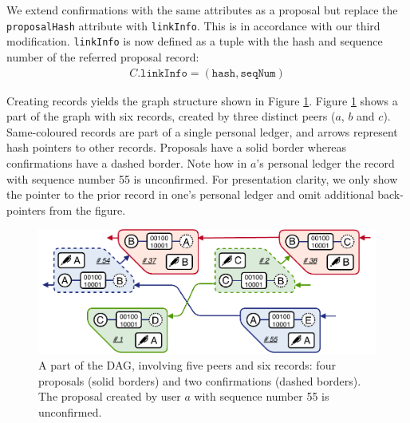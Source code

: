 We extend confirmations with the same attributes as a proposal but replace the \texttt{proposalHash} attribute with \texttt{linkInfo}.
This is in accordance with our third modification.
\texttt{linkInfo} is now defined as a tuple with the hash and sequence number of the referred proposal record:
\begin{align*}
	C.\texttt{linkInfo} = (\texttt{hash}, \texttt{seqNum})
\end{align*}

Creating records yields the graph structure shown in Figure \ref{fig:fullchain}.
Figure \ref{fig:fullchain} shows a part of the \TrustChain{} graph with six records, created by three distinct peers ($ a $, $ b $ and $ c $).
Same-coloured records are part of a single personal ledger, and arrows represent hash pointers to other records.
Proposals have a solid border whereas confirmations have a dashed border.
Note how in $ a $'s personal ledger the record with sequence number 55 is unconfirmed.
For presentation clarity, we only show the pointer to the prior record in one's personal ledger and omit additional back-pointers from the figure.

\begin{figure}[t]
	\centering
	\includegraphics[width=\linewidth]{trustchain/assets/fullchain}
	\caption{A part of the \TrustChain{} DAG, involving five peers and six records: four proposals (solid borders) and two confirmations (dashed borders). The proposal created by user $ a $ with sequence number 55 is unconfirmed.}
	\label{fig:fullchain}
\end{figure}

